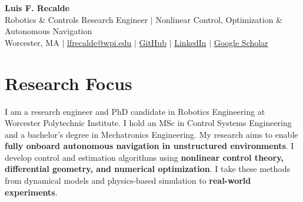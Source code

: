 \documentclass[letterpaper,11pt]{article}
\begin{document}
\begin{center}
\textcolor{AuthorTeal}{\textbf{\Huge Luis F. Recalde}} \\ \vspace{3pt}
\small Robotics \& Controls Research Engineer $|$ Nonlinear Control, Optimization \& Autonomous Navigation \\ \vspace{3pt}
Worcester, MA $|$ \href{mailto:lfrecalde@wpi.edu}{lfrecalde@wpi.edu} $|$
\href{https://github.com/lfrecalde1}{GitHub} $|$
\href{https://www.linkedin.com/in/luis-f-recalde-8a6432123}{LinkedIn} $|$
\href{https://scholar.google.com/citations?user=_v1511cAAAAJ}{Google Scholar}
\end{center}
\vspace{-12pt}
\section{Research Focus}
{\small I am a research engineer and PhD candidate in Robotics Engineering at Worcester Polytechnic Institute.
I hold an MSc in Control Systems Engineering and a bachelor's degree in Mechatronics Engineering.
My research aims to enable \textbf{fully onboard autonomous navigation in unstructured environments}.
I develop control and estimation algorithms using \textbf{nonlinear control theory, differential geometry, and numerical optimization}.
I take these methods from dynamical models and physics-based simulation to \textbf{real-world experiments}.\par}
\end{document}
